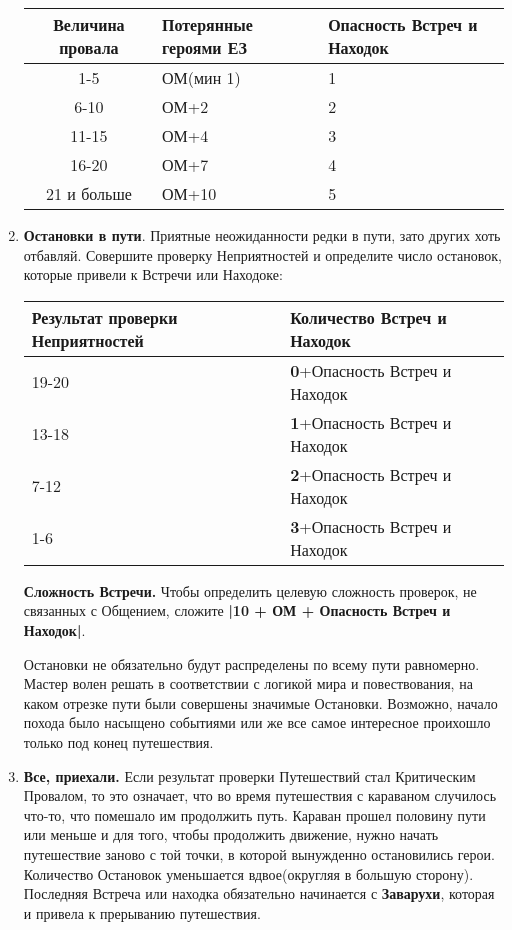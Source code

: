 \begin{enumerate}
\begin{center}
\begin{tabular}{|c|p{5cm}|p{5cm}|}
\hline
Величина провала & Потерянные героями ЕЗ & Опасность Встреч и Находок \\ \hline
1-5 & ОМ(мин 1) & 1 \\ \hline
6-10 & ОМ+2 & 2 \\ \hline
11-15 & ОМ+4 & 3 \\ \hline
16-20 & ОМ+7 & 4 \\ \hline
21 и больше & ОМ+10 & 5 \\ \hline
\end{tabular}
\end{center}
\item \textbf{Остановки в пути}. Приятные неожиданности редки в пути, зато других хоть отбавляй. Совершите проверку Неприятностей и определите число остановок, которые привели к Встречи или Находоке:
\begin{center}
\begin{tabular}{ |p{2.7cm}|p{12cm}| }
\hline
\textbf{Результат проверки Неприятностей} & \textbf{Количество Встреч и Находок}
\\ \hline
19-20 & \textbf{0}+Опасность Встреч и Находок
\\ \hline
13-18 & \textbf{1}+Опасность Встреч и Находок
\\ \hline
7-12 & \textbf{2}+Опасность Встреч и Находок
\\ \hline
1-6 & \textbf{3}+Опасность Встреч и Находок
\\ \hline
\end{tabular}
\end{center}
\textbf{Сложность Встречи.} Чтобы определить целевую сложность проверок, не связанных с Общением, сложите \textbf{|10 + ОМ + Опасность Встреч и Находок|}.
\begin{tcolorbox}
Остановки не обязательно будут распределены по всему пути равномерно. Мастер волен решать в соответствии с логикой мира и повествования, на каком отрезке пути были совершены значимые Остановки. Возможно, начало похода было насыщено событиями или же все самое интересное проихошло только под конец путешествия.
\end{tcolorbox}
\item \textbf{Все, приехали.} Если результат проверки Путешествий стал Критическим Провалом, то это означает, что во время путешествия с караваном случилось что-то, что помешало им продолжить путь. Караван прошел половину пути или меньше и для того, чтобы продолжить движение, нужно начать путешествие заново с той точки, в которой вынужденно остановились герои.
\newline Количество Остановок уменьшается вдвое(округляя в большую сторону). Последняя Встреча или находка обязательно начинается с \textbf{Заварухи}, которая и привела к прерыванию путешествия.


\end{enumerate}
